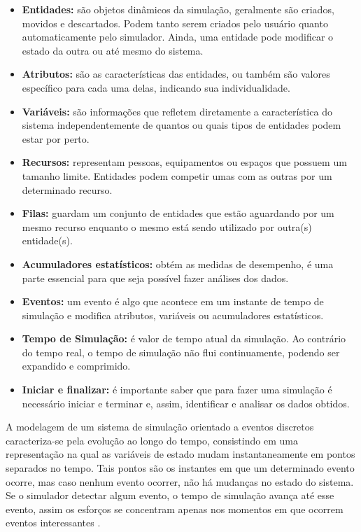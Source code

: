 \documentclass[pt,disc,oneside]{ufscpgeasthesis}
\begin{document}
			\begin{itemize}
				\item{\textbf{Entidades:}} são objetos dinâmicos da simulação, geralmente são criados, movidos e descartados.
				Podem tanto serem criados pelo usuário quanto automaticamente pelo simulador.
				Ainda, uma entidade pode modificar o estado da outra ou até mesmo do sistema.
				\item{\textbf{Atributos:}} são as características das entidades, ou também são valores específico para cada uma delas, indicando sua individualidade.
				\item{\textbf{Variáveis:}} são informações que refletem diretamente a característica do sistema independentemente de quantos ou quais tipos de entidades podem estar por perto.
				\item{\textbf{Recursos:}} representam pessoas, equipamentos ou espaços que possuem um tamanho limite.
				Entidades podem competir umas com as outras por um determinado recurso.
				\item{\textbf{Filas:}} guardam um conjunto de entidades que estão aguardando por um mesmo recurso enquanto o mesmo está sendo utilizado por outra(s) entidade(s).
				\item{\textbf{Acumuladores estatísticos:}} obtém as medidas de desempenho, é uma parte essencial para que seja possível fazer análises dos dados.
				\item{\textbf{Eventos:}} um evento é algo que acontece em um instante de tempo de simulação e modifica atributos, variáveis ou acumuladores estatísticos.
				\item{\textbf{Tempo de Simulação:}} é valor de tempo atual da simulação.
				Ao contrário do tempo real, o tempo de simulação não flui continuamente, podendo ser expandido e comprimido.
				\item{\textbf{Iniciar e finalizar:}} é importante saber que para fazer uma simulação é necessário iniciar e terminar e, assim, identificar e analisar os dados obtidos.
			\end{itemize}

			A modelagem de um sistema de simulação orientado a eventos discretos caracteriza-se pela evolução ao longo do tempo, consistindo em uma representação na qual as variáveis de estado mudam instantaneamente em pontos separados no tempo.
			Tais pontos são os instantes em que um determinado evento ocorre, mas caso nenhum evento ocorrer, não há mudanças no estado do sistema.
			Se o simulador detectar algum evento, o tempo de simulação avança até esse evento, assim os esforços se concentram apenas nos momentos em que ocorrem eventos interessantes \cite{Princeton}.
 
\end{document}
